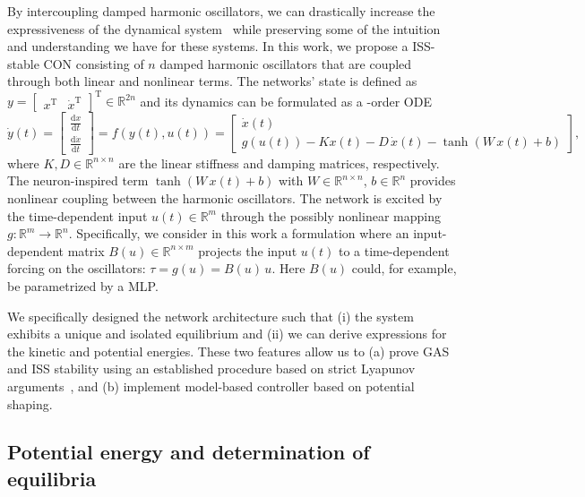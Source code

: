 By intercoupling damped harmonic oscillators, we can drastically increase the expressiveness of the dynamical system~\cite{rusch2020coupled, ceni2024random, lanthaler2024neural} while preserving some of the intuition and understanding we have for these systems. In this work, we propose a \gls{ISS}-stable \gls{CON} consisting of $n$ damped harmonic oscillators that are coupled through both linear and nonlinear terms. The networks' state is defined as $y = \begin{bmatrix}
    x^\mathrm{T} & \dot{x}^\mathrm{T}
\end{bmatrix}^\mathrm{T} \in \mathbb{R}^{2n}$ and its dynamics can be formulated as a -order \gls{ODE}
\begin{equation}\label{eq:con:con_dynamics}
    \dot{y}(t) = \begin{bmatrix}
        \frac{\mathrm{d}x}{\mathrm{d}t}\\
        \frac{\mathrm{d}\dot{x}}{\mathrm{d}t}
    \end{bmatrix} = f(y(t), u(t)) = \begin{bmatrix}
        \dot{x}(t)\\
        g(u(t)) -K x(t) - D \, \dot{x}(t) - \tanh(W \, x(t) + b)
    \end{bmatrix},
\end{equation}
where $K, D \in \mathbb{R}^{n \times n}$ are the linear stiffness and damping matrices, respectively. The neuron-inspired term $\tanh(W \, x(t) + b)$ with $W \in \mathbb{R}^{n \times n}$, $b \in \mathbb{R}^n$ provides nonlinear coupling between the harmonic oscillators.
The network is excited by the time-dependent input $u(t) \in \mathbb{R}^m$ through the possibly nonlinear mapping $g: \mathbb{R}^m \to \mathbb{R}^n$.
Specifically, we consider in this work a formulation where an input-dependent matrix $B(u) \in \mathbb{R}^{n \times m}$ projects the input $u(t)$ to a time-dependent forcing on the oscillators: $\tau = g(u) = B(u) \, u$. Here $B(u)$ could, for example, be parametrized by a \gls{MLP}.

We specifically designed the network architecture such that (i) the system exhibits a unique and isolated equilibrium and (ii) we can derive expressions for the kinetic and potential energies. These two features allow us to (a) prove \gls{GAS} and \gls{ISS} stability using an established procedure based on strict Lyapunov arguments~\cite{calzolari2020exponential, wu2022passive}, and (b) implement model-based controller based on potential shaping.

\subsection{Potential energy and determination of equilibria}

